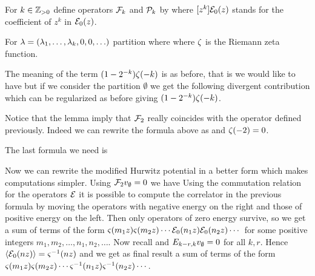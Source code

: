 \documentclass[../main/main.tex]{subfiles}
\begin{document}
\begin{definition}
	For $k\in\mathbb Z_{>0}$ define operators $\mathcal F_k$ and $\mathcal P_k$ by
	where $[z^k]\mathcal E_0(z)$ stands for the coefficient of $z^k$ in $\mathcal E_0(z)$. 
\end{definition}

\begin{lemma}[{\cite[Eq. 2.11]{OP1}}]
	For $\lambda=(\lambda_1,\ldots,\lambda_k,0,0,\ldots)$ partition
	where
	where $\zeta$ is the Riemann zeta function.
\end{lemma}
The meaning of the term $(1-2^{-k})\zeta(-k)$ is as before, that is we would like to have
but if we consider the partition $\emptyset$ we get the following divergent contribution
which can be regularized as before giving $(1-2^{-k})\zeta(-k)$.

Notice that the lemma imply that $\mathcal F_2$ really coincides with the operator defined previously. Indeed we can rewrite the formula above as
and $\zeta(-2)=0$. 

The last formula we need is 
\begin{lemma}[{\cite[Eq. 2.14]{OP2}}]
\end{lemma}

Now we can rewrite the modified Hurwitz potential in a better form which makes computations simpler. Using $\mathcal F_2v_\emptyset=0$ we have
Using the commutation relation for the operators $\mathcal E$ it is possible to compute the correlator in the previous formula by moving the operators with negative energy on the right and those of positive energy on the left. Then only operators of zero energy survive, so we get a sum of terms of the form $\varsigma(m_1z)\varsigma(m_2z)\cdots\mathcal E_0(n_1z)\mathcal E_0(n_2z)\cdots$ for some positive integers $m_1,m_2,\ldots,n_1,n_2,\ldots$.
Now recall
and $E_{k-r,k}v_\emptyset=0$ for all $k,r$. Hence $\langle\mathcal E_0(nz)\rangle=\varsigma^{-1}(nz)$ and we get as final result a sum of terms of the form $\varsigma(m_1z)\varsigma(m_2z)\cdots\varsigma^{-1}(n_1z)\varsigma^{-1}(n_2 z)\cdots$.  
\end{document}
